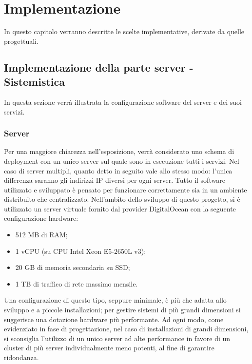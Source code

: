 \chapter{Implementazione}

In questo capitolo verranno descritte le scelte implementative, derivate da quelle progettuali.

\section{Implementazione della parte server - Sistemistica}
In questa sezione verrà illustrata la configurazione software del server e dei suoi servizi.

\subsection{Server}
Per una maggiore chiarezza nell'esposizione, verrà considerato uno schema di deployment con un unico server sul quale sono in esecuzione tutti i servizi.
Nel caso di server multipli, quanto detto in seguito vale allo stesso modo: l'unica differenza saranno gli indirizzi IP diversi per ogni server.
Tutto il software utilizzato e sviluppato è pensato per funzionare correttamente sia in un ambiente distribuito che centralizzato.
Nell'ambito dello sviluppo di questo progetto, si è utilizzato un server virtuale fornito dal provider DigitalOcean con la seguente configurazione hardware:
\begin{itemize}
 \item 512 MB di RAM;
 \item 1 vCPU (su CPU Intel Xeon E5-2650L v3);
 \item 20 GB di memoria secondaria su SSD;
 \item 1 TB di traffico di rete massimo mensile.
\end{itemize}
Una configurazione di questo tipo, seppure minimale, è più che adatta allo sviluppo e a piccole installazioni; per gestire sistemi di più grandi dimensioni si suggerisce una dotazione hardware più performante.
Ad ogni modo, come evidenziato in fase di progettazione, nel caso di installazioni di grandi dimensioni, si sconsiglia l'utilizzo di un unico server ad alte performance in favore di un cluster di più server individualmente meno potenti, al fine di garantire ridondanza.

